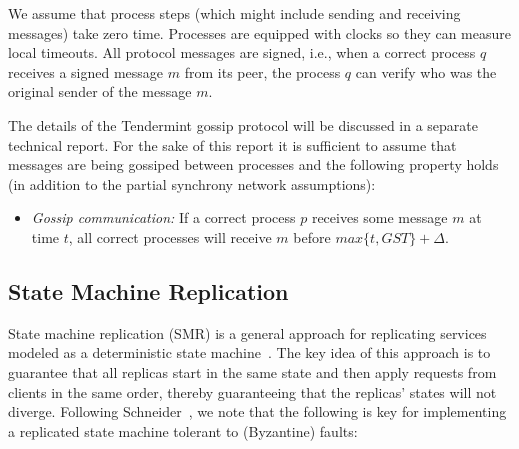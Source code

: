 We assume that process steps (which might include sending and receiving messages) take zero time.
Processes are equipped with clocks so they can measure local timeouts.
All protocol messages are signed, i.e., when a correct process $q$ receives a signed message $m$ from its peer, the process $q$ can verify who was the original sender of the message $m$.

The details of the Tendermint gossip protocol will be discussed in a separate technical report. For the sake of this report it is sufficient to assume that messages are being gossiped between processes and the following property holds (in addition to the partial synchrony network assumptions):

\begin{itemize}
	\item \emph{Gossip communication:} If a correct process $p$ receives some message $m$ at time $t$, all correct processes will receive $m$ before $max\{t, GST\} + \Delta$.    
\end{itemize}




\subsection{State Machine Replication}

State machine replication (SMR) is a general approach for replicating
services modeled as a deterministic state
machine~\cite{Lam78:cacm,Sch90:survey}.
The key idea of this approach is to guarantee that all replicas start
in the same state and then apply requests from clients in the
same order, thereby guaranteeing that the replicas' states will
not diverge.
Following Schneider~\cite{Sch90:survey}, we note that the following is key for
implementing a replicated state machine tolerant to (Byzantine) faults:

